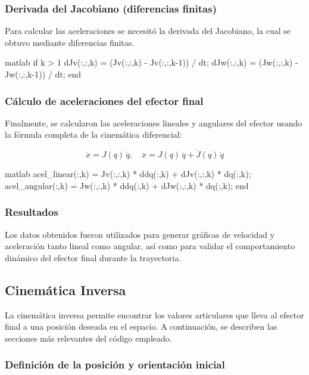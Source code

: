 \subsubsection*{Derivada del Jacobiano (diferencias finitas)}

Para calcular las aceleraciones se necesitó la derivada del Jacobiano, la cual se obtuvo mediante diferencias finitas.

\begin{matlabcode}{matlab}
	if k > 1
	dJv(:,:,k) = (Jv(:,:,k) - Jv(:,:,k-1)) / dt;
	dJw(:,:,k) = (Jw(:,:,k) - Jw(:,:,k-1)) / dt;
	end
\end{matlabcode}

\subsubsection*{Cálculo de aceleraciones del efector final}

Finalmente, se calcularon las aceleraciones lineales y angulares del efector usando la fórmula completa de la cinemática diferencial:

\[
\dot{x} = J(q)\,\dot{q}, \quad \ddot{x} = J(q)\,\ddot{q} + \dot{J}(q)\,\dot{q}
\]

\begin{matlabcode}{matlab}
	acel_linear(:,k)  = Jv(:,:,k) * ddq(:,k) + dJv(:,:,k) * dq(:,k);
	acel_angular(:,k) = Jw(:,:,k) * ddq(:,k) + dJw(:,:,k) * dq(:,k);
	end
\end{matlabcode}

\subsubsection*{Resultados}

Los datos obtenidos fueron utilizados para generar gráficas de velocidad y aceleración tanto lineal como angular, así como para validar el comportamiento dinámico del efector final durante la trayectoria.



\subsection{Cinemática Inversa}

La cinemática inversa permite encontrar los valores articulares que lleva al efector final a una posición deseada en el espacio. A continuación, se describen las secciones más relevantes del código empleado.

\subsubsection*{Definición de la posición y orientación inicial}

